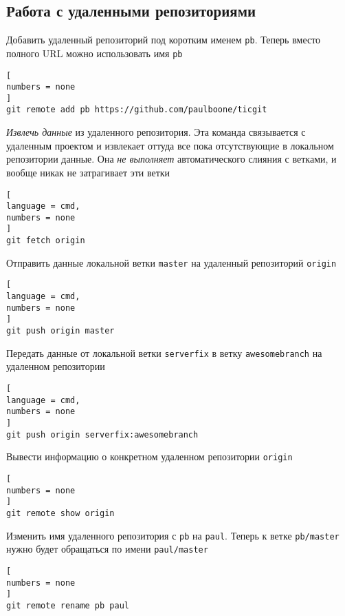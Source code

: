 \documentclass[%
	11pt,
	a4paper,
	utf8,
		]{article}
\begin{document}
\subsection{Работа с удаленными репозиториями}

Добавить удаленный репозиторий под коротким именем \texttt{pb}. Теперь вместо полного URL можно использовать имя \texttt{pb}

\begin{lstlisting}[
numbers = none
]
git remote add pb https://github.com/paulboone/ticgit
\end{lstlisting}


\emph{Извлечь данные} из удаленного репозитория. Эта команда связывается с удаленным проектом и извлекает оттуда все пока отсутствующие в локальном репозитории данные. Она \emph{\color{red}не выполняет} автоматического слияния с ветками, и вообще никак не затрагивает эти ветки

\begin{lstlisting}[
language = cmd,
numbers = none
]
git fetch origin
\end{lstlisting}


Отправить данные локальной ветки \texttt{master} на удаленный репозиторий \texttt{origin}

\begin{lstlisting}[
language = cmd,
numbers = none
]
git push origin master
\end{lstlisting}


Передать данные от локальной ветки \texttt{serverfix} в ветку \texttt{awesomebranch} на удаленном репозитории

\begin{lstlisting}[
language = cmd,
numbers = none
]
git push origin serverfix:awesomebranch
\end{lstlisting}

Вывести информацию о конкретном удаленном репозитории \texttt{origin}

\begin{lstlisting}[
numbers = none
]
git remote show origin
\end{lstlisting}


Изменить имя удаленного репозитория с \texttt{pb} на \texttt{paul}. Теперь к ветке \texttt{pb/master} нужно будет обращаться по имени \texttt{paul/master}

\begin{lstlisting}[
numbers = none
]
git remote rename pb paul
\end{lstlisting}
\end{document}
